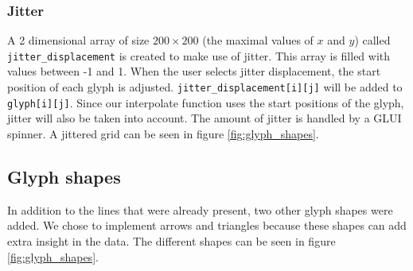 		\subsubsection*{Jitter}
			A 2 dimensional array of size $200 \times 200$ (the maximal values of $x$ and $y$) called \texttt{jitter\_displacement} is created to make use of jitter.
			This array is filled with values between -1 and 1.
			When the user selects jitter displacement, the start position of each glyph is adjusted.
			\texttt{jitter\_displacement[i][j]} will be added to \texttt{glyph[i][j]}.
			Since our interpolate function uses the start positions of the glyph, jitter will also be taken into account.
			The amount of jitter is handled by a GLUI spinner.
			A jittered grid can be seen in figure \ref{fig:glyph_shapes}.

	\subsection*{Glyph shapes}
		In addition to the lines that were already present, two other glyph shapes were added.
		We chose to implement arrows and triangles because these shapes can add extra insight in the data.
		The different shapes can be seen in figure \ref{fig:glyph_shapes}.
